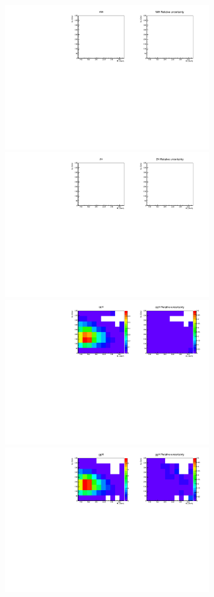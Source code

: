 % 
% 
\begin{figure}[htp]
\centering
\includegraphics[width=0.8\textwidth]{figures/2dtemplate_WH_mH400_1j.pdf}
\includegraphics[width=0.8\textwidth]{figures/2dtemplate_ZH_mH400_1j.pdf}
\includegraphics[width=0.8\textwidth]{figures/2dtemplate_qqH_mH400_1j.pdf}
\includegraphics[width=0.8\textwidth]{figures/2dtemplate_ggH_mH400_1j.pdf}

\end{figure}
